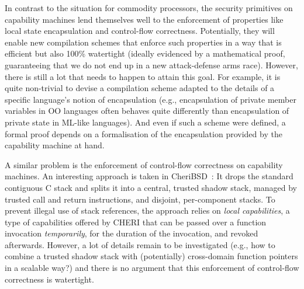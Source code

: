 \documentclass[compsoc,conference,letterpaper,fleqn]{IEEEtran}
\begin{document}
In contrast to the situation for commodity processors, the security
primitives on capability machines lend themselves well to the
enforcement of properties like local state encapsulation and
control-flow correctness. Potentially, they will enable new compilation
schemes that enforce such properties in a way that is efficient but
also 100\% watertight (ideally evidenced by a mathematical proof,
guaranteeing that we do not end up in a new attack-defense arms
race). However, there is still a lot that needs to happen to attain
this goal. For example, it is quite non-trivial to devise a
compilation scheme adapted to the details of a specific language's
notion of encapsulation (e.g., encapsulation of private member
variables in OO languages often behaves quite differently than
encapsulation of private state in ML-like languages). And even if such
a scheme were defined, a formal proof depends on a formalisation of
the encapsulation provided by the capability machine at hand.

A similar problem is the enforcement of control-flow correctness on capability
machines. An interesting approach is taken in CheriBSD~\citep{Watson2015Cheri}:
It drops the standard contiguous C stack and splits it into a central, trusted
shadow stack, managed by trusted call and return instructions, and disjoint,
per-component stacks. To prevent illegal use of stack references, the approach
relies on \emph{local capabilities}, a type of capabilities offered by CHERI
that can be passed over a function invocation \emph{temporarily}, for the
duration of the invocation, and revoked afterwards. However, a lot of details
remain to be investigated (e.g., how to combine a trusted shadow stack with
(potentially) cross-domain function pointers in a scalable way?) and there is no
argument that this enforcement of control-flow correctness is watertight.
\end{document}
